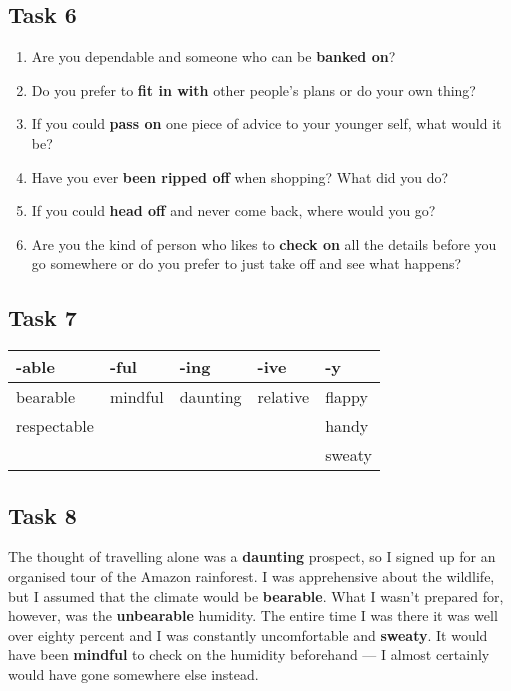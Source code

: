 \documentclass[a4paper]{article}
\begin{document}
        \subsection*{Task 6}
            \begin{enumerate}
                \item Are you dependable and someone who can be \textbf{banked on}?
                \item Do you prefer to \textbf{fit in with} other people's plans or do your own thing?
                \item If you could \textbf{pass on} one piece of advice to your younger self, what would it be?
                \item Have you ever \textbf{been ripped off} when shopping? What did you do?
                \item If you could \textbf{head off} and never come back, where would you go?
                \item Are you the kind of person who likes to \textbf{check on} all the details before you go somewhere or do you prefer to just take off and see what happens?
            \end{enumerate}
        \subsection*{Task 7}
            \begin{table}[H]
                \begin{tabular}{@{}llll|l|@{}}
                \toprule
                \multicolumn{1}{|l|}{-able}       & \multicolumn{1}{l|}{-ful}    & \multicolumn{1}{l|}{-ing}     & -ive     & -y     \\ \midrule
                \multicolumn{1}{|l|}{bearable}    & \multicolumn{1}{l|}{mindful} & \multicolumn{1}{l|}{daunting} & relative & flappy \\ \midrule
                \multicolumn{1}{|l|}{respectable} &                              &                               &          & handy  \\ \cmidrule(r){1-1} \cmidrule(l){5-5} 
                                                &                              &                               &          & sweaty \\ \cmidrule(l){5-5} 
                \end{tabular}
            \end{table}
        \subsection*{Task 8}
            The thought of travelling alone was a \textbf{daunting} prospect, so I signed up for an organised tour of the Amazon rainforest.
            I was apprehensive about the wildlife, but I assumed that the climate would be \textbf{bearable}.
            What I wasn't prepared for, however, was the \textbf{unbearable} humidity.
            The entire time I was there it was well over eighty percent and I was constantly uncomfortable and \textbf{sweaty}.
            It would have been \textbf{mindful} to check on the humidity beforehand --- I almost certainly would have gone somewhere else instead.
\end{document}
